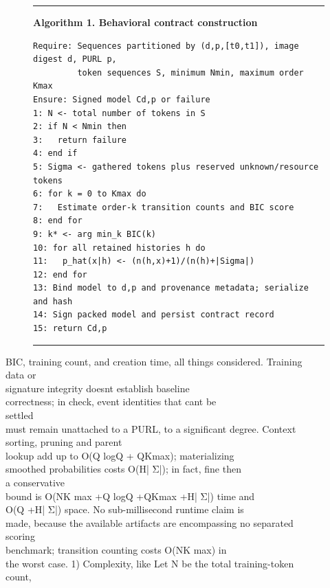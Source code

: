 \documentclass[conference]{IEEEtran}
\begin{document}
\begin{figure}[t]
\centering\footnotesize
\begin{minipage}{\columnwidth}
\hrule\smallskip
\textbf{Algorithm 1. Behavioral contract construction}\par\smallskip
\begin{verbatim}
Require: Sequences partitioned by (d,p,[t0,t1]), image digest d, PURL p,
         token sequences S, minimum Nmin, maximum order Kmax
Ensure: Signed model Cd,p or failure
1: N <- total number of tokens in S
2: if N < Nmin then
3:   return failure
4: end if
5: Sigma <- gathered tokens plus reserved unknown/resource tokens
6: for k = 0 to Kmax do
7:   Estimate order-k transition counts and BIC score
8: end for
9: k* <- arg min_k BIC(k)
10: for all retained histories h do
11:   p_hat(x|h) <- (n(h,x)+1)/(n(h)+|Sigma|)
12: end for
13: Bind model to d,p and provenance metadata; serialize and hash
14: Sign packed model and persist contract record
15: return Cd,p
\end{verbatim}
\smallskip\hrule
\end{minipage}
\end{figure}
BIC, training count, and creation time, all things considered. Training\\
data or\\
signature integrity doesn\textquotesingle t establish baseline\\
correctness; in check, event identities that can\textquotesingle t be\\
settled\\
must remain unattached to a PURL, to a significant degree. Context\\
sorting, pruning and parent\\
lookup add up to O(Q logQ + QKmax); materializing\\
smoothed probabilities costs O(H| Σ|); in fact, fine then\\
a conservative\\
bound is O(NK max +Q logQ +QKmax +H| Σ|) time and\\
O(Q +H| Σ|) space. No sub-millisecond runtime claim is\\
made, because the available artifacts are encompassing no separated\\
scoring\\
benchmark; transition counting costs O(NK max) in\\
the worst case. 1) Complexity, like Let N be the total training-token\\
count,\\
\end{document}
